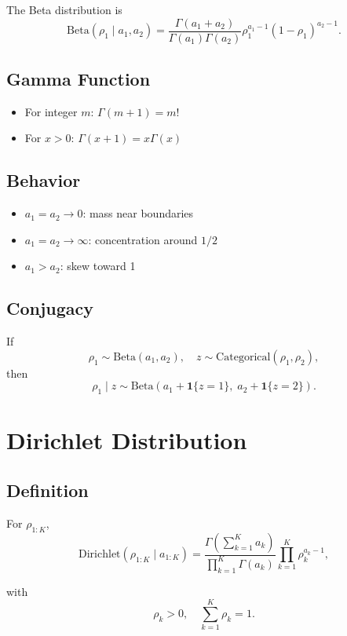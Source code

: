 \documentclass[12pt,oneside]{book}
\numberwithin{equation}{section}
\theoremstyle{definition}
\theoremstyle{plain}
\theoremstyle{remark}
\begin{document}
The Beta distribution is
\[
\mathrm{Beta}(\rho_1 \mid a_1,a_2)
=
\frac{\Gamma(a_1 + a_2)}{\Gamma(a_1)\Gamma(a_2)}
\rho_1^{a_1 - 1}(1 - \rho_1)^{a_2 - 1}.
\]

\subsection*{Gamma Function}

\begin{itemize}
\item For integer $m$: $\Gamma(m+1) = m!$
\item For $x > 0$: $\Gamma(x+1) = x\Gamma(x)$
\end{itemize}

\subsection*{Behavior}

\begin{itemize}
\item $a_1 = a_2 \to 0$: mass near boundaries
\item $a_1 = a_2 \to \infty$: concentration around $1/2$
\item $a_1 > a_2$: skew toward 1
\end{itemize}

\subsection*{Conjugacy}

If
\[
\rho_1 \sim \mathrm{Beta}(a_1,a_2), \quad z \sim \mathrm{Categorical}(\rho_1,\rho_2),
\]
then
\[
\rho_1 \mid z \sim \mathrm{Beta}(a_1 + \mathbf{1}\{z=1\},\; a_2 + \mathbf{1}\{z=2\}).
\]

\section{Dirichlet Distribution}

\subsection*{Definition}

For $\rho_{1:K}$,
\[
\mathrm{Dirichlet}(\rho_{1:K} \mid a_{1:K})
=
\frac{\Gamma\left(\sum_{k=1}^K a_k\right)}{\prod_{k=1}^K \Gamma(a_k)}
\prod_{k=1}^K \rho_k^{a_k - 1},
\]

with
\[
\rho_k > 0, \quad \sum_{k=1}^K \rho_k = 1.
\]
\end{document}
